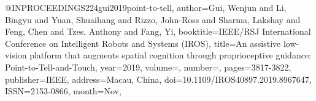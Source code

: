 @INPROCEEDINGS{224gui2019point-to-tell,
author={Gui, Wenjun and Li, Bingyu and Yuan, Shuaihang and Rizzo, John-Ross and Sharma, Lakshay and Feng, Chen and Tzes, Anthony and Fang, Yi},
booktitle={IEEE/RSJ International Conference on Intelligent Robots and Systems (IROS)}, 
title={An assistive low-vision platform that augments spatial cognition through proprioceptive guidance: Point-to-Tell-and-Touch}, 
year={2019},
volume={},
number={},
pages={3817-3822},
publisher={IEEE},
address={Macau, China},
doi={10.1109/IROS40897.2019.8967647},
ISSN={2153-0866},
month={Nov},}